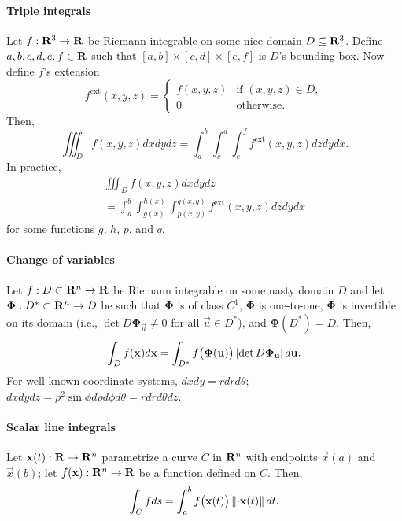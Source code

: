 \documentclass[10pt,landscape]{article}
\begin{document}
\begin{multicols*}{3}
\paragraph{Triple integrals}
Let $f : \mathbf{R}^3 \to \mathbf{R}$ be Riemann integrable on some nice domain $D \subseteq \mathbf{R}^3$.
Define $a, b, c, d, e, f \in \mathbf{R}$ such that $[a,b] \times [c,d] \times [e,f]$ is $D$'s bounding box.
Now define $f$'s extension
\begin{equation}
  f^{\text{ext}}(x,y,z) = \begin{cases}
    f(x,y,z) & \text{if $(x,y,z) \in D$},\\
    0 & \text{otherwise}.
    \end{cases}
\end{equation}
Then,
\begin{equation}
  \iiint_D f(x,y,z) dxdydz = \int_a^b \int_c^d \int_e^f f^{\text{ext}}(x,y,z) dzdydx.
\end{equation}
In practice,
\begin{multline}
  \iiint_D f(x,y,z) dxdydz\\ = \int_a^b \int_{g(x)}^{h(x)} \int_{p(x,y)}^{q(x,y)} f^{\text{ext}}(x,y,z) dzdydx
\end{multline}
for some functions $g$, $h$, $p$, and $q$.

\paragraph{Change of variables}
Let $f : D \subset \mathbf{R}^n \to \mathbf{R}$ be Riemann integrable on some nasty domain $D$ and let $\boldsymbol\Phi : D^* \subset \mathbf{R}^n \to D$ be such that $\boldsymbol\Phi$ is of class $C^1$, $\boldsymbol\Phi$ is one-to-one, $\boldsymbol\Phi$ is invertible on its domain (i.e., $\det D\boldsymbol\Phi_{\vec u} \ne 0$ for all $\vec u \in D^*$), and $\boldsymbol\Phi(D^*) = D$.  Then,
\begin{equation}
  \int_D f(\mathbf{x}) d\mathbf{x} = \int_{D^*} f\big(\boldsymbol\Phi(\mathbf{u})\big)\left\lvert\det D\boldsymbol\Phi_{\mathbf{u}}\right\rvert d\mathbf{u}.
\end{equation}
For well-known coordinate systems, $dxdy = rdrd\theta$; $dxdydz = \rho^2\sin\phi d\rho d\phi d\theta = rdrd\theta dz$.

\paragraph{Scalar line integrals}
Let $\mathbf{x}(t) : \mathbf{R} \to \mathbf{R}^n$ parametrize a curve $C$ in $\mathbf{R}^n$ with endpoints $\vec x(a)$ and $\vec x(b)$; let $f(\mathbf{x}) : \mathbf{R}^n \to \mathbf{R}$ be a function defined on $C$.
Then,
\begin{equation}
  \int_C fds = \int_a^b f\big(\vec x(t)\big) \norm{\vec{\flux x}(t)} dt.
\end{equation}


\end{multicols*}
\end{document}
